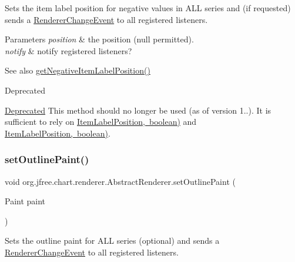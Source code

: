 Sets the item label position for negative values in A\+LL series and (if requested) sends a \mbox{\hyperlink{}{Renderer\+Change\+Event}} to all registered listeners.


\begin{DoxyParams}{Parameters}
{\em position} & the position ({\ttfamily null} permitted). \\
\hline
{\em notify} & notify registered listeners?\\
\hline
\end{DoxyParams}
\begin{DoxySeeAlso}{See also}
\mbox{\hyperlink{classorg_1_1jfree_1_1chart_1_1renderer_1_1_abstract_renderer_a1342825ba4cb7d47141e73b83fc50903}{get\+Negative\+Item\+Label\+Position()}}
\end{DoxySeeAlso}
\begin{DoxyRefDesc}{Deprecated}
\item[\mbox{\hyperlink{deprecated__deprecated000142}{Deprecated}}]This method should no longer be used (as of version 1..). It is sufficient to rely on \mbox{\hyperlink{}{Item\+Label\+Position, boolean)}} and \mbox{\hyperlink{}{Item\+Label\+Position, boolean)}}. \end{DoxyRefDesc}
\mbox{\label{classorg_1_1jfree_1_1chart_1_1renderer_1_1_abstract_renderer_af12d47fe216d03827398ea257e11b8b3}} 
\subsubsection{\texorpdfstring{set\+Outline\+Paint()}{setOutlinePaint()}\hspace{0.1cm}{\footnotesize\ttfamily [1/2]}}
{\footnotesize\ttfamily void org.\+jfree.\+chart.\+renderer.\+Abstract\+Renderer.\+set\+Outline\+Paint (\begin{DoxyParamCaption}\item[{Paint}]{paint }\end{DoxyParamCaption})}

Sets the outline paint for A\+LL series (optional) and sends a \mbox{\hyperlink{}{Renderer\+Change\+Event}} to all registered listeners.


